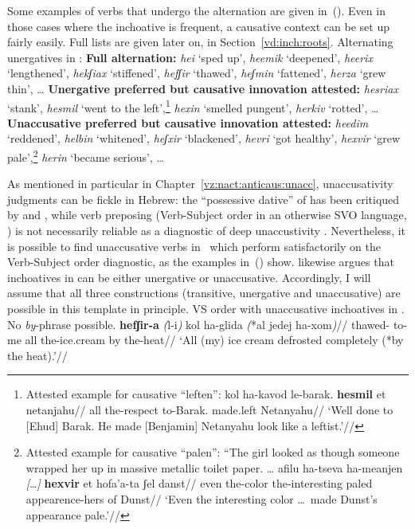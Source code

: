 Some examples of verbs that undergo the alternation are given in~(\nextx). Even in those cases where the inchoative is frequent, a causative context can be set up fairly easily. Full lists are given later on, in Section~\ref{vd:inch:roots}.
\pex\label{ex:vd:thif-alt}Alternating unergatives in \thif:
	\a \textbf{Full alternation:} \emph{hei{\texttslig}} `sped up', \emph{heemik} `deepened', \emph{heerix} `lengthened', \emph{hekʃiax} `stiffened', \emph{hefʃir} `thawed', \emph{heʃmin} `fattened', \emph{herza} `grew thin', \dots
	\a \textbf{Unergative preferred but causative innovation attested:} \emph{hesriax} `stank', \emph{hesmil} `went to the left',\footnote{Attested example for causative ``leften'':
	\ex
		\begingl
		\gla kol ha-kavod le-barak. \textbf{hesmil} et netanjahu//
		\glb all the-respect to-Barak. made.left  Netanyahu//
		\glft `Well done to [Ehud] Barak. He made [Benjamin] Netanyahu look like a leftist.'//
		\endgl
	\xe
	} \emph{he{\texttslig}xin} `smelled pungent', \emph{herkiv} `rotted', \dots
	\a \textbf{Unaccusative preferred but causative innovation attested:} \emph{heedim} `reddened', \emph{helbin} `whitened', \emph{heʃxir} `blackened', \emph{hevri} `got healthy',
		\emph{hexvir} `grew pale',\footnote{Attested example for causative ``palen'':
		\ex ``The girl looked as though someone wrapped her up in massive metallic toilet paper. \dots
			\begingl
			\gla afilu ha-tseva ha-meanjen \emph{[}\dots\emph{]} \textbf{hexvir} et hofa'a-ta ʃel danst//
			\glb even the-color the-interesting {} paled  appearence-hers of Dunst//
			\glft `Even the interesting color \dots~made Dunst's appearance pale.'//
			\endgl
		\xe
		} \emph{her{\texttslig}in} `became serious', \dots
\xe

As mentioned in particular in Chapter~\ref{vz:nact:anticaus:unacc}, unaccusativity judgments can be fickle in Hebrew: the ``possessive dative'' of \cite{borergrodzinsky86} has been critiqued by \cite{gafter14li} and \cite{linzen14pd}, while verb preposing (Verb-Subject order in an otherwise SVO language, \citealt{shlonsky87}) is not necessarily reliable as a diagnostic of deep unaccustivity \citep{kastner17gjgl}. Nevertheless, it is possible to find unaccusative verbs in \thif~which perform satisfactorily on the Verb-Subject order diagnostic, as the examples in~(\nextx) show. \citet[149]{borer91} likewise argues that inchoatives in {\thif} can be either unergative or unaccusative. Accordingly, I will assume that all three constructions (transitive, unergative and unaccusative) are possible in this template in principle.
\pex\label{ex:vd:vs} VS order with unaccusative inchoatives in \thif. No \emph{by}-phrase possible.
	\a \begingl
		\gla \textbf{hefʃir-a} \emph{(}l-i\emph{)} kol ha-glida \emph{(}*{al jedej} ha-xom\emph{)}//
		\glb thawed- to-me all the-ice.cream \phantom{*(}by the-heat//
		\glft `All (my) ice cream defrosted completely (*by the heat).'//
	\endgl
	
